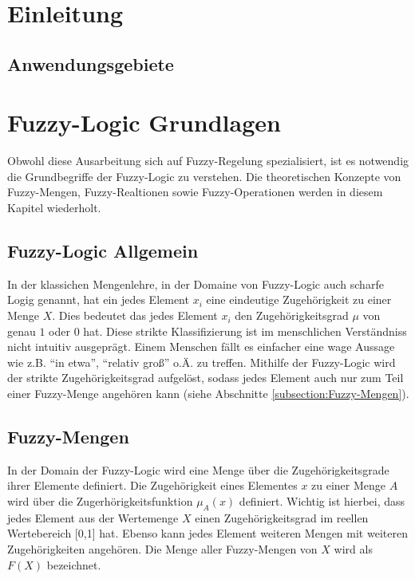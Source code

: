 \documentclass[12pt,a4paper,bibliography=totocnumbered,listof=totocnumbered]{article}
\theoremstyle{Umgebung}
\begin{document}
\section{Einleitung}

\subsection{Anwendungsgebiete}

\section{Fuzzy-Logic Grundlagen}

Obwohl diese Ausarbeitung sich auf Fuzzy-Regelung spezialisiert, ist es notwendig die Grundbegriffe der Fuzzy-Logic zu verstehen. Die theoretischen Konzepte von Fuzzy-Mengen, Fuzzy-Realtionen sowie Fuzzy-Operationen werden in diesem Kapitel wiederholt.

\subsection{Fuzzy-Logic Allgemein}

In der klassichen Mengenlehre, in der Domaine von Fuzzy-Logic auch scharfe Logig genannt, hat ein jedes Element $x_i$ eine eindeutige Zugehörigkeit zu einer Menge $X$. Dies bedeutet das jedes Element $x_i$ den Zugehörigkeitsgrad $\mu$ von genau $1$ oder $0$ hat. Diese strikte Klassifizierung ist im menschlichen Verständniss nicht intuitiv ausgeprägt. Einem Menschen fällt es einfacher eine wage Aussage wie z.B. \enquote{in etwa}, \enquote{relativ groß} o.Ä. zu treffen. Mithilfe der Fuzzy-Logic wird der strikte Zugehörigkeitsgrad aufgelöst, sodass jedes Element auch nur zum Teil einer Fuzzy-Menge angehören kann (siehe Abschnitte \ref{subsection:Fuzzy-Mengen}).

\label{subsection:Fuzzy-Mengen}
\subsection{Fuzzy-Mengen}

In der Domain der Fuzzy-Logic wird eine Menge über die Zugehörigkeitsgrade ihrer Elemente definiert. Die Zugehörigkeit eines Elementes $x$ zu einer Menge $A$ wird über die Zugerhörigkeitsfunktion $\mu_A(x)$ definiert. Wichtig ist hierbei, dass jedes Element aus der Wertemenge $X$ einen Zugehörigkeitsgrad im reellen Wertebereich [0,1] hat. Ebenso kann jedes Element weiteren Mengen mit weiteren Zugehörigkeiten angehören. Die Menge aller Fuzzy-Mengen von $X$ wird als $F(X)$ bezeichnet. 
\end{document}
